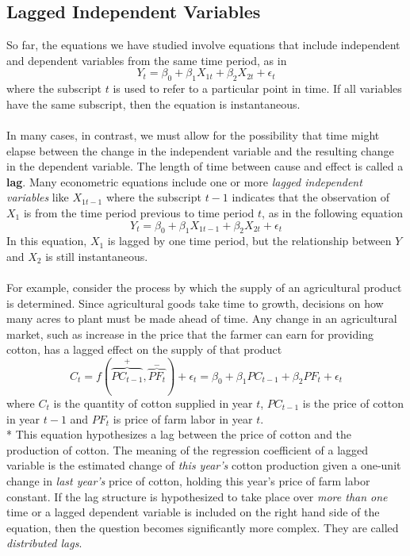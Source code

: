\documentclass[11pt]{article}
\begin{document}
\subsection{Lagged Independent Variables}
So far, the equations we have studied involve equations that include independent and dependent variables from the same time period, as in
\begin{equation}
Y_t = \beta_0 + \beta_1X_{1t} + \beta_2X_{2t} + \epsilon_t \label{eg7_17}
\end{equation}
where the subscript $t$ is used to refer to a particular point in time. If all variables have the same subscript, then the equation is instantaneous.\\ \\
In many cases, in contrast, we must allow for the possibility that time might elapse between the change in the independent variable and the resulting change in the dependent variable. The length of time between cause and effect is called a \textbf{lag}. Many econometric equations include one or more \textit{lagged independent variables} like $X_{1t-1}$ where the subscript $t-1$ indicates that the observation of $X_1$ is from the time period previous to time period $t$, as in the following equation
\begin{equation}
Y_t = \beta_0 + \beta_1X_{1t-1} + \beta_2X_{2t} + \epsilon_t \label{eg7_18}
\end{equation}
In this equation, $X_1$ is lagged by one time period, but the relationship between $Y$ and $X_2$ is still instantaneous.\\ \\
For example, consider the process by which the supply of an agricultural product is determined. Since agricultural goods take time to growth, decisions on how many acres to plant must be made ahead of time.  Any change in an agricultural market, such as increase in the price that the farmer can earn for providing cotton, has a lagged effect on the supply of that product
\begin{equation}
C_t = f(\overbrace{PC_{t-1}}^+, \overbrace{PF_t}^{-}) + \epsilon_t = \beta_0 + \beta_1PC_{t-1} + \beta_2PF_t + \epsilon_t \label{eg7_19}
\end{equation}
where $C_t$ is the quantity of cotton supplied in year $t$, $PC_{t-1}$ is the price of cotton in year $t-1$ and $PF_t$ is price of farm labor in year $t$.\\*
This equation hypothesizes a lag between the price of cotton and the production of cotton. The meaning of the regression coefficient of a lagged variable is the estimated change of \textit{this year's} cotton production given a one-unit change in \textit{last year's} price of cotton, holding this year's price of farm labor constant. If the lag structure is hypothesized to take place over \textit{more than one} time or a lagged dependent variable is included on the right hand side of the equation, then the question becomes significantly more complex. They are called \textit{distributed lags}.
\end{document}
